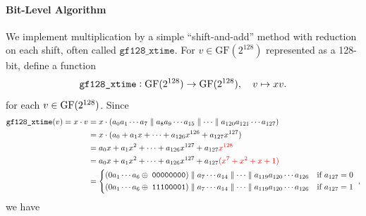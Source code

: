 \paragraph{Bit-Level Algorithm}
We implement multiplication by a simple ``shift-and-add'' method with reduction on each
shift, often called \(\mathtt{gf128\_xtime}\). For \(v\in\mathrm{GF}(2^{128})\) represented as a 128-bit, define a function \[
\texttt{gf128\_xtime}:\operatorname{GF}(2^{128})\to\operatorname{GF}(2^{128}),\quad v\mapsto xv.
\] for each $v\in\operatorname{GF}(2^{128})$. Since \begin{align*}
\texttt{gf128\_xtime}(v)=x\cdot v
&=x\cdot(a_{0}a_{1}\cdots a_{7}\parallel a_{8}a_{9}\cdots a_{15}\parallel\cdots\parallel a_{120}a_{121}\cdots a_{127}) \\
&=x\cdot (a_0+a_1x+\cdots +a_{126}x^{126} +a_{127}x^{127}) \\
&=a_0x+a_1x^2+\cdots+a_{126}x^{127}+a_{127}{\color{red}x^{128}}\\
&=a_0x+a_1x^2+\cdots+a_{126}x^{127}+a_{127}{\color{red}(x^7+x^2+x+1)}\\
&=\begin{cases*}
(0a_1\cdots a_6\oplus\;\texttt{00000000})\parallel a_{7}\cdots a_{14}\parallel\cdots\parallel a_{119}a_{120}\cdots a_{126}  &if $a_{127}=0$\\
(0a_1\cdots a_6\oplus\;\texttt{11100001})\parallel a_{7}\cdots a_{14}\parallel\cdots\parallel a_{119}a_{120}\cdots a_{126}  &if $a_{127}=1$
\end{cases*},
\end{align*} we have
